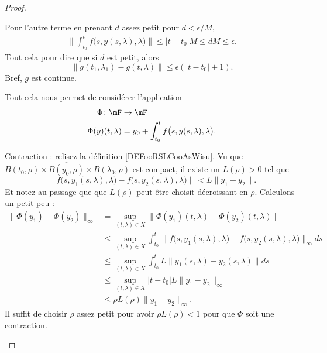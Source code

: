 \begin{proof}
\begin{subproof}
		Pour l'autre terme en prenant \( d\) assez petit pour \( d<\epsilon/M\),
		\begin{subequations}
			\begin{align}
				\| \int_{t_0}^tf\big( s,y(s,\lambda),\lambda \big) \|\leq | t-t_0 |M\leq dM\leq \epsilon.
			\end{align}
		\end{subequations}
		Tout cela pour dire que si \( d\) est petit, alors
		\begin{equation}
			\| g(t_1,\lambda_1)-g(t,\lambda) \|\leq \epsilon (| t-t_0 |+1).
		\end{equation}
		Bref, \( g\) est continue.

		Tout cela nous permet de considérer l'application
		\begin{equation}
			\begin{aligned}
				\Phi\colon \mF     & \to \mF                                                 \\
				\Phi(y)(t,\lambda) & = y_0+ \int_{t_0}^tf\big(s, y(s,\lambda),\lambda \big).
			\end{aligned}
		\end{equation}

		Contraction : relisez la définition \ref{DEFooRSLCooAsWisu}. Vu que \( \overline{B(t_0,\rho)}\times \overline{B(y_0,\rho)}\times \overline{B(\lambda_0,\rho)}\) est compact, il existe un \( L(\rho)>0\) tel que \begin{equation}
			\| f\big( s,y_1(s,\lambda),\lambda \big)-f\big( s,y_2(s,\lambda),\lambda \big) \|<L\| y_1-y_2 \|.
		\end{equation}
		Et notez au passage que que \( L(\rho)\) peut être choisit décroissant en \( \rho\). Calculons un petit peu :
		\begin{subequations}
			\begin{align}
				\| \Phi(y_1)-\Phi(y_2) \|_{\infty} & =\sup_{(t,\lambda)\in X}\| \Phi(y_1)(t,\lambda)-\Phi(y_2)(t,\lambda) \|                                                             \\
				                                   & \leq \sup_{(t,\lambda)\in X}\int_{t_0}^t\| f\big(s,y_1(s,\lambda),\lambda\big)- f\big( s,y_2(s,\lambda),\lambda \big) \|_{\infty}ds \\
				                                   & \leq\sup_{(t,\lambda)\in X}\int_{t_0}^tL\| y_1(s,\lambda)-y_2(s,\lambda) \|ds                                                       \\
				                                   & \leq\sup_{(t,\lambda)\in X}| t-t_0 |L\| y_1-y_2 \|_{\infty}                                                                         \\
				                                   & \leq\rho L(\rho)\| y_1-y_2 \|_{\infty}.
			\end{align}
		\end{subequations}
		Il suffit de choisir \( \rho\) assez petit pour avoir \( \rho L(\rho)<1\) pour que \( \Phi\) soit une contraction.


\end{subproof}
\end{proof}
